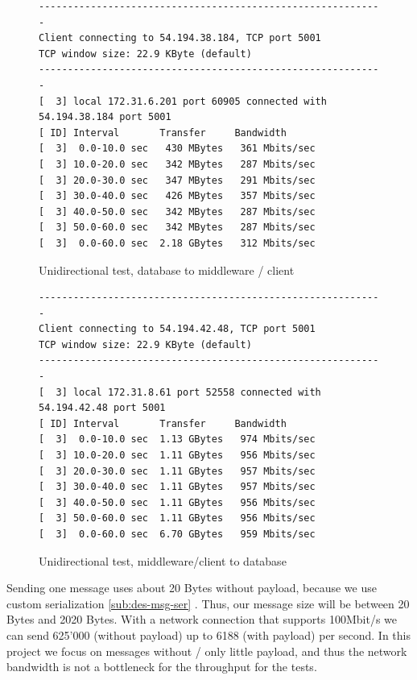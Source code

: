 \documentclass[milestone1.tex]{subfiles}
\begin{document}
\begin{figure}[H]
\begin{center}
\begin{verbatim}
------------------------------------------------------------
Client connecting to 54.194.38.184, TCP port 5001
TCP window size: 22.9 KByte (default)
------------------------------------------------------------
[  3] local 172.31.6.201 port 60905 connected with 54.194.38.184 port 5001
[ ID] Interval       Transfer     Bandwidth
[  3]  0.0-10.0 sec   430 MBytes   361 Mbits/sec
[  3] 10.0-20.0 sec   342 MBytes   287 Mbits/sec
[  3] 20.0-30.0 sec   347 MBytes   291 Mbits/sec
[  3] 30.0-40.0 sec   426 MBytes   357 Mbits/sec
[  3] 40.0-50.0 sec   342 MBytes   287 Mbits/sec
[  3] 50.0-60.0 sec   342 MBytes   287 Mbits/sec
[  3]  0.0-60.0 sec  2.18 GBytes   312 Mbits/sec
\end{verbatim}
\end{center}
\caption{Unidirectional test, database to middleware / client}
\label{fig:iperfserver}
\end{figure}


\begin{figure}[H]
\begin{center}
\begin{verbatim}
------------------------------------------------------------
Client connecting to 54.194.42.48, TCP port 5001
TCP window size: 22.9 KByte (default)
------------------------------------------------------------
[  3] local 172.31.8.61 port 52558 connected with 54.194.42.48 port 5001
[ ID] Interval       Transfer     Bandwidth
[  3]  0.0-10.0 sec  1.13 GBytes   974 Mbits/sec
[  3] 10.0-20.0 sec  1.11 GBytes   956 Mbits/sec
[  3] 20.0-30.0 sec  1.11 GBytes   957 Mbits/sec
[  3] 30.0-40.0 sec  1.11 GBytes   957 Mbits/sec
[  3] 40.0-50.0 sec  1.11 GBytes   956 Mbits/sec
[  3] 50.0-60.0 sec  1.11 GBytes   956 Mbits/sec
[  3]  0.0-60.0 sec  6.70 GBytes   959 Mbits/sec

\end{verbatim}
\end{center}
\caption{Unidirectional test, middleware/client to database}
\label{fig:iperfserver2}
\end{figure}

Sending one message uses about 20 Bytes without payload, because we use custom serialization \ref{sub:des-msg-ser} . Thus, our message size will be between 20 Bytes and 2020 Bytes. With a network connection that supports 100Mbit/s we can send 625'000 (without payload) up to 6188 (with payload) per second. In this project we focus on messages without / only little payload, and thus the network bandwidth is not a bottleneck for the throughput for the tests.
\end{document}
